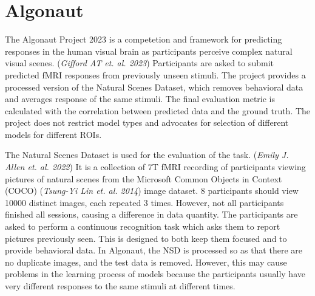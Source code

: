 \documentclass[11pt]{article}
\begin{document}
\section{Algonaut}
\label{sec:orgd2f34d1}
The Algonaut Project 2023 is a competetion and framework for predicting responses in the human visual brain as participants perceive complex natural visual scenes. (\emph{Gifford AT et. al. 2023}) Participants are asked to submit predicted fMRI responses from previously unseen stimuli. The project provides a processed version of the Natural Scenes Dataset, which removes behavioral data and averages response of the same stimuli. The final evaluation metric is calculated with the correlation between predicted data and the ground truth. The project does not restrict model types and advocates for selection of different models for different ROIs.

The Natural Scenes Dataset is used for the evaluation of the task. (\emph{Emily J. Allen et. al. 2022}) It is a collection of 7T fMRI recording of participants viewing pictures of natural scenes from the Microsoft Common Objects in Context (COCO) (\emph{Tsung-Yi Lin et. al. 2014}) image dataset. 8 participants should view 10000 distinct images, each repeated 3 times. However, not all participants finished all sessions, causing a difference in data quantity. The participants are asked to perform a continuous recognition task which asks them to report pictures previously seen. This is designed to both keep them focused and to provide behavioral data. In Algonaut, the NSD is processed so as that there are no duplicate images, and the test data is removed. However, this may cause problems in the learning process of models because the participants usually have very different responses to the same stimuli at different times.
\end{document}
